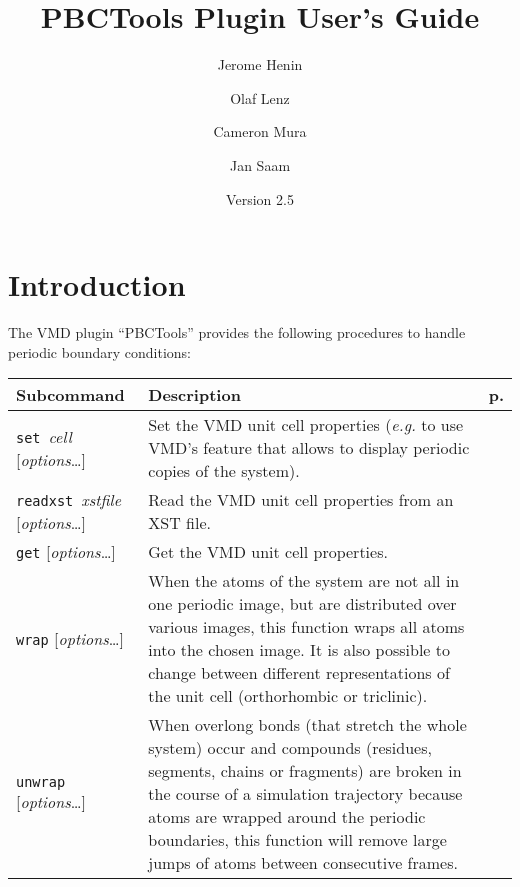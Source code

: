 \documentclass[a4paper, DIV12]{scrartcl}
\newcommand{\eg}{\emph{e.g.}\xspace}
\newcommand{\pbctools}{PBCTools\xspace}
\begin{document}
\title{\pbctools Plugin User's Guide}
\author{Jerome Henin \and Olaf Lenz \and Cameron Mura \and Jan Saam}
\date{Version 2.5}

\maketitle

\section{Introduction}
The VMD plugin ``\pbctools'' provides the following procedures to
handle periodic boundary conditions:

\begin{center}
  \begin{tabular}{|p{}|p{}|r|}
    \hline
    \textbf{Subcommand} & \textbf{Description} & \textbf{p.}\\\hline\hline
  
    \mbox{\texttt{set} \textit{cell}} [\textit{options}\dots]
    & Set the VMD unit cell properties (\eg to use VMD's feature that
    allows to display periodic copies of the system). 
    & \pageref{sec:set}
    \\\hline
  
    \mbox{\texttt{readxst} \textit{xstfile}} [\textit{options}\dots]
    & Read the VMD unit cell properties from an XST file.
    & \pageref{sec:readxst} 
    \\\hline
  
    \texttt{get} [\textit{options}\dots]
    & Get the VMD unit cell properties. 
    & \pageref{sec:get}
    \\\hline
  
    \texttt{wrap} [\textit{options}\dots]
    & When the atoms of the system are not all in one periodic image,
    but are distributed over various images, this function wraps all
    atoms into the chosen image. It is also possible to change between
    different representations of the unit cell (orthorhombic or triclinic).
    & \pageref{sec:wrap}
    \\\hline
  
    \texttt{unwrap} [\textit{options}\dots]
    & When overlong bonds (that stretch the whole system) occur and
    compounds (residues, segments, chains or fragments) are broken in
    the course of a simulation trajectory because atoms are wrapped
    around the periodic boundaries, this function will remove large
    jumps of atoms between consecutive frames.
    & \pageref{sec:unwrap}
    \\\hline
  

\end{tabular}
\end{center}
\end{document}
